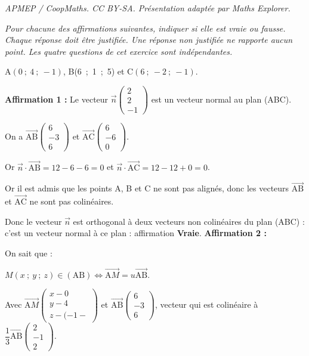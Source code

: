 \documentclass[10pt]{article}
\providecommand{\vect}[1]{\overrightarrow{#1}}
\begin{document}
\noindent\textit{APMEP / CoopMaths. CC BY-SA. Présentation adaptée par Maths Explorer.}\par\medskip
\medskip

\emph{Pour chacune des affirmations suivantes, indiquer si elle est vraie ou fausse. Chaque réponse doit être justifiée. Une réponse non justifiée ne rapporte aucun point.
Les quatre questions de cet exercice sont indépendantes.}

\medskip


\begin{center}A$(0~;~ 4~;~-1)$, \quad B(6~;~1~;~5) \quad et \quad C$(6~;~-2~;~-1)$.\end{center} 



\medskip

\textbf{Affirmation 1 :} Le vecteur $\vect{n}\begin{pmatrix}2\\2\\-1\end{pmatrix}$ est un vecteur normal au plan (ABC).

\medskip

On a $\vect{\text{AB}}\begin{pmatrix}6\\-3\\6\end{pmatrix}$ et $\vect{\text{AC}}\begin{pmatrix}6\\-6\\0\end{pmatrix}$.

Or  $\vect{n} \cdot \vect{\text{AB}} = 12 - 6 - 6 = 0$ et $\vect{n} \cdot \vect{\text{AC}} = 12 - 12  + 0  = 0$.

Or il est admis que les points A, B et C ne sont pas alignés, donc les vecteurs $\vect{\text{AB}}$ et $\vect{\text{AC}}$ ne sont pas colinéaires.

Donc le vecteur $\vect{n}$ est orthogonal à deux vecteurs non colinéaires du plan (ABC) : c'est un vecteur normal à ce plan : affirmation \textbf{Vraie}.
\textbf{Affirmation 2 :} 






On sait que :

$M(x~;~y~;~z) \in (\text{AB}) \iff \vect{\text{A}M} = u\vect{\text{AB}}$.

Avec $\vect{\text{A}M}\begin{pmatrix}x - 0\\y - 4\\z - (-1-\end{pmatrix}$ et $\vect{\text{AB}}\begin{pmatrix}6\\-3\\6\end{pmatrix}$, vecteur qui est colinéaire à $\dfrac13\vect{\text{AB}}\begin{pmatrix}2\\-1\\2\end{pmatrix}$.
\end{document}
